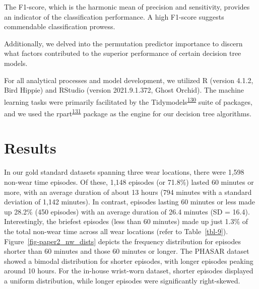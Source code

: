 \documentclass[
  10pt,
]{scrbook}
\begin{document}
The F1-score, which is the harmonic mean of precision and sensitivity,
provides an indicator of the classification performance. A high F1-score
suggests commendable classification prowess.

Additionally, we delved into the permutation predictor importance to
discern what factors contributed to the superior performance of certain
decision tree models.

For all analytical processes and model development, we utilized R
(version 4.1.2, Bird Hippie) and RStudio (version 2021.9.1.372, Ghost
Orchid). The machine learning tasks were primarily facilitated by the
Tidymodels\textsuperscript{\protect\hyperlink{ref-kuhn_tidymodels_2020}{130}}
suite of packages, and we used the
rpart\textsuperscript{\protect\hyperlink{ref-rpart}{131}} package as the
engine for our decision tree algorithms.

\hypertarget{results-1}{%
\section{Results}\label{results-1}}

In our gold standard datasets spanning three wear locations, there were
1,598 non-wear time episodes. Of these, 1,148 episodes (or 71.8\%)
lasted 60 minutes or more, with an average duration of about 13 hours
(794 minutes with a standard deviation of 1,142 minutes). In contrast,
episodes lasting 60 minutes or less made up 28.2\% (450 episodes) with
an average duration of 26.4 minutes (SD = 16.4). Interestingly, the
briefest episodes (less than 60 minutes) made up just 1.3\% of the total
non-wear time across all wear locations (refer to Table~\ref{tbl-9}).
Figure~\ref{fig-paper2_nw_dists} depicts the frequency distribution for
episodes shorter than 60 minutes and those 60 minutes or longer. The
PHASAR dataset showed a bimodal distribution for shorter episodes, with
longer episodes peaking around 10 hours. For the in-house wrist-worn
dataset, shorter episodes displayed a uniform distribution, while longer
episodes were significantly right-skewed.

\begingroup

\footnotesize
\end{document}

